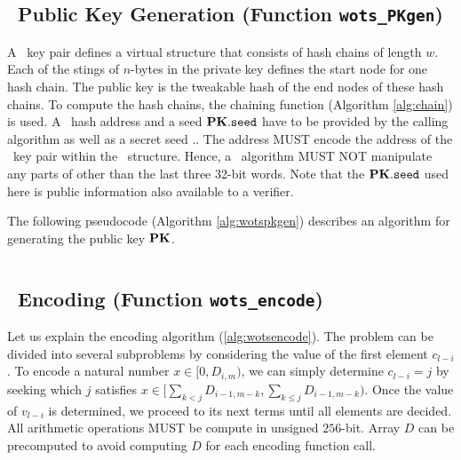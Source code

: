 \subsection{\WOTSCS\ Public Key Generation (Function \texttt{wots\_PKgen})}

A \WOTSCS\ key pair defines a virtual structure that consists of \len hash chains of length $w.$ Each of the \len stings of $n$-bytes in the private key defines the start node for one hash chain. The public key is the tweakable hash of the end nodes of these hash chains. To compute the hash chains, the chaining function (Algorithm \ref{alg:chain}) is used. A \WOTSCS\ hash address \ADRS and a seed $\mathbf{PK}.\mathtt{seed}$ have to be provided by the calling algorithm as well as a secret seed \sk.\seed. The address \ADRS MUST encode the address of the \WOTSCS\ key pair within the \SPHINCSA\ structure. Hence, a \WOTSCS\ algorithm MUST NOT manipulate any parts of \ADRS other than the last three 32-bit words. Note that the $\mathbf{PK}.\mathtt{seed}$ used here is public information also available to a verifier. 

The following pseudocode (Algorithm \ref{alg:wotspkgen}) describes an algorithm for generating the public key $\mathbf{PK}$.

\begin{algorithm}
\inputminted[breaklines,linenos,tabsize=2,mathescape,escapeinside=||]{C}{code/wots_PKgen.cs}
\caption{\texttt{wots\_PKgen} --- Generating a \WOTSCS\ public key.}
\label{alg:wotspkgen}
\end{algorithm}


\subsection{\WOTSCS\ Encoding (Function \texttt{wots\_encode})}

Let us explain the encoding algorithm (\cref{alg:wotsencode}). The problem can be divided into several subproblems by considering the value of the first element $c_{l-i}$. To encode a natural number $x\in [0,D_{i,m})$, we can simply determine $c_{l-i}=j$ by seeking which $j$ satisfies $x\in [\sum_{k<j}D_{i-1,m-k},\sum_{k\leq j}D_{i-1,m-k})$. Once the value of $v_{l-i}$ is determined, we proceed to its next terms until all elements are decided. All arithmetic operations MUST be compute in unsigned $256$-bit. Array $D$ can be precomputed to avoid computing $D$ for each encoding function call. 

\begin{algorithm}
\inputminted[breaklines,linenos,tabsize=2,mathescape,escapeinside=||]{C}{code/wots_encode.cs}
\caption{\texttt{wots\_encode} --- Encoding message to constant-sum encoding.}
\label{alg:wotsencode}
\end{algorithm}

